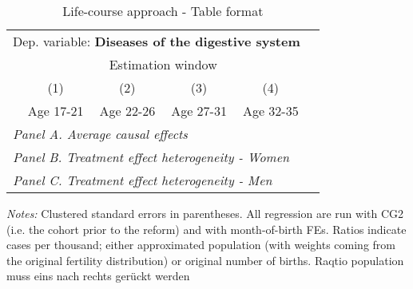  \begin{table}[H] \centering \begin{threeparttable} \caption{Life-course approach - Table format} {\def\sym#1{\ifmmode^{#1}\else\(^{#1}\)\fi} \begin{tabular}{l*{5}{c}} \toprule \multicolumn{5}{l}{Dep. variable: \textbf{Diseases of the digestive system}} \\ & \multicolumn{4}{c}{Estimation window} \\ \cmidrule(lr){2-5}
            &\multicolumn{1}{c}{(1)}&\multicolumn{1}{c}{(2)}&\multicolumn{1}{c}{(3)}&\multicolumn{1}{c}{(4)}\\
            &\multicolumn{1}{c}{Age 17-21}&\multicolumn{1}{c}{Age 22-26}&\multicolumn{1}{c}{Age 27-31}&\multicolumn{1}{c}{Age 32-35}\\
\midrule
 \multicolumn{5}{l}{\emph{Panel A. Average causal effects}} \\      \midrule\multicolumn{5}{l}{\emph{Panel B. Treatment effect heterogeneity - Women}} \\      \midrule\multicolumn{5}{l}{\emph{Panel C. Treatment effect heterogeneity - Men}} \\      
\bottomrule \end{tabular} } \begin{tablenotes} \item \scriptsize \emph{Notes:} Clustered standard errors in parentheses. All regression are run with CG2 (i.e. the cohort prior to the reform) and with month-of-birth FEs. Ratios indicate cases per thousand; either approximated population (with weights coming from the original fertility distribution) or original number of births. Raqtio population muss eins nach rechts gerückt werden \end{tablenotes} \end{threeparttable} \end{table} 
